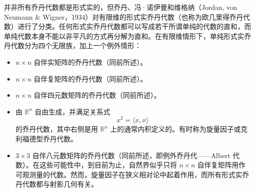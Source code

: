 并非所有乔丹代数都是形式实的，但乔丹、冯·诺伊曼和维格纳（Jordan, von Neumann & Wigner，1934）对有限维的形式实乔丹代数（也称为欧几里得乔丹代数）进行了分类。任何形式实乔丹代数都可以写成若干所谓单纯的代数的直和，而单纯代数本身不能以非平凡的方式再分解为直和。在有限维情形下，单纯形式实乔丹代数分为四个无限族，加上一个例外情形：
\begin{itemize}
\item $n \times n$ 自伴实矩阵的乔丹代数（同前所述）。
\item $n \times n$ 自伴复矩阵的乔丹代数（同前所述）。
\item $n \times n$ 自伴四元数矩阵的乔丹代数（同前所述）。
\item 由 $\mathbb{R}^n$ 自由生成，并满足关系式
$$
x^2 = \langle x, x \rangle~
$$
的乔丹代数，其中右侧是用 $\mathbb{R}^n$ 上的通常内积定义的。有时称为旋量因子或克利福德型乔丹代数。
\item $3 \times 3$ 自伴八元数矩阵的乔丹代数（同前所述，即例外乔丹代——Albert 代数）。在这些可能性中，到目前为止，自然界似乎只将 $n \times n$ 自伴复矩阵用作可观测量的代数。然而，旋量因子在狭义相对论中起着作用，而所有形式实乔丹代数都与射影几何有关。
\end{itemize}
